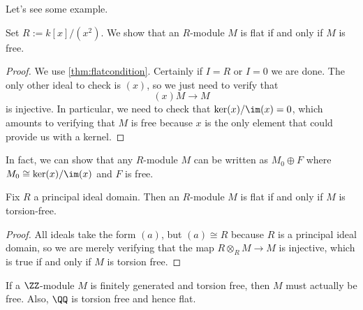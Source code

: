 Let's see some example.
\begin{exe}
	Set $R:=k[x]/\left(x^2\right)$. We show that an $R$-module $M$ is flat if and only if $M$ is free.
\end{exe}
\begin{proof}
	We use \autoref{thm:flatcondition}. Certainly if $I=R$ or $I=0$ we are done. The only other ideal to check is $(x)$, so we just need to verify that
	\[(x)M\to M\]
	is injective. In particular, we need to check that $\ker(x)/\im(x)=0$, which amounts to verifying that $M$ is free because $x$ is the only element that could provide us with a kernel.
\end{proof}
\begin{remark}[Serganova]
	In fact, we can show that any $R$-module $M$ can be written as $M_0\oplus F$ where $M_0\cong\ker(x)/\im(x)$ and $F$ is free.
\end{remark}
\begin{exe}
	Fix $R$ a principal ideal domain. Then an $R$-module $M$ is flat if and only if $M$ is torsion-free.
\end{exe}
\begin{proof}
	All ideals take the form $(a)$, but $(a)\cong R$ because $R$ is a principal ideal domain, so we are merely verifying that the map $R\otimes_RM\to M$ is injective, which is true if and only if $M$ is torsion free.
\end{proof}
\begin{example}
	If a $\ZZ$-module $M$ is finitely generated and torsion free, then $M$ must actually be free. Also, $\QQ$ is torsion free and hence flat.
\end{example}

